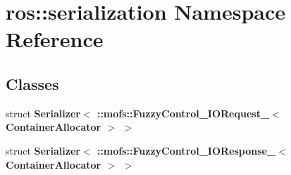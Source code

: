 \section{ros\-:\-:serialization Namespace Reference}
\label{namespaceros_1_1serialization}
\subsection*{Classes}
\begin{DoxyCompactItemize}
\item 
struct {\bf Serializer$<$ \-::mofs\-::\-Fuzzy\-Control\-\_\-\-I\-O\-Request\-\_\-$<$ Container\-Allocator $>$ $>$}
\item 
struct {\bf Serializer$<$ \-::mofs\-::\-Fuzzy\-Control\-\_\-\-I\-O\-Response\-\_\-$<$ Container\-Allocator $>$ $>$}
\end{DoxyCompactItemize}
